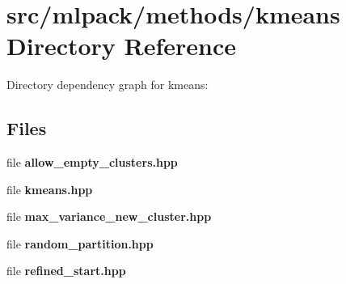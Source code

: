 \section{src/mlpack/methods/kmeans Directory Reference}
\label{dir_db48f86cd517b0746c8865c406f00fa6}
Directory dependency graph for kmeans\-:
\subsection*{Files}
\begin{DoxyCompactItemize}
\item 
file {\bf allow\-\_\-empty\-\_\-clusters.\-hpp}
\item 
file {\bf kmeans.\-hpp}
\item 
file {\bf max\-\_\-variance\-\_\-new\-\_\-cluster.\-hpp}
\item 
file {\bf random\-\_\-partition.\-hpp}
\item 
file {\bf refined\-\_\-start.\-hpp}
\end{DoxyCompactItemize}
